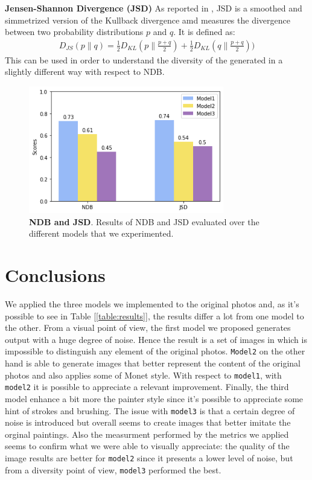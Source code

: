 \documentclass[10pt,twocolumn,letterpaper]{article}
\begin{document}
\textbf{Jensen-Shannon Divergence (JSD)} As reported in \cite{jsd}, JSD is a smoothed and simmetrized version of the Kullback divergence amd measures the divergence between two probability distributions $p$ and $q$. It is defined as: 
\begin{equation}
	\begin{split}
		D_{JS}(p\|q) = \frac{1}{2}D_{KL}(p\|\frac{p+q}{2})+  \frac{1}{2}D_{KL}(q\|\frac{p+q}{2}))
	\end{split}
\end{equation}
This can be used in order to understand the diversity of the generated in a slightly different way with respect to NDB.


\begin{figure}
	\includegraphics[width=23em]{index.png}
	\caption{\textbf{NDB and JSD}. Results of NDB and JSD evaluated over the different models that we experimented.}
	\label{figure:ndb-jsd}
\end{figure}

\section{Conclusions}
We applied the three models we implemented to the original photos and, as it's possible to see in Table [\ref{table:results}], the results differ a lot from one model to the other. From a visual point of view, the first model we proposed generates output with a huge degree of noise. Hence the result is a set of images in which is impossible to distinguish any element of the original photos. \texttt{Model2} on the other hand is able to generate images that better represent the content of the original photos and also applies some of Monet style. With respect to \texttt{model1}, with \texttt{model2} it is possible to appreciate a relevant improvement. Finally, the third model enhance a bit more the painter style since it's possible to appreciate some hint of strokes and brushing. The issue with \texttt{model3} is that a certain degree of noise is introduced but overall seems to create images that better imitate the orginal paintings. Also the measurment performed by the metrics we applied seems to confirm what we were able to visually appreciate: the quality of the image results are better for \texttt{model2} since it presents a lower level of noise, but from a diversity point of view, \texttt{model3} performed the best. 

{\small


}
\end{document}
